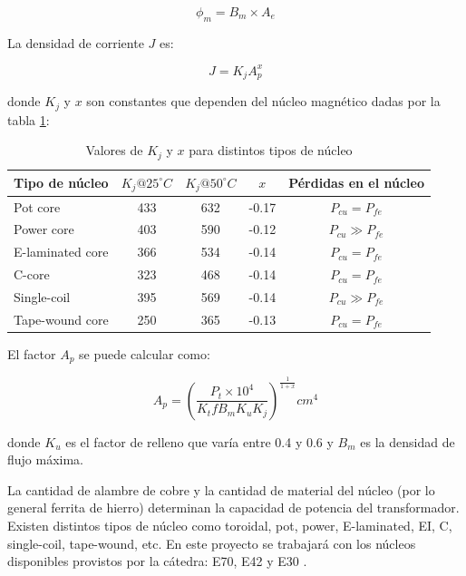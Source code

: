 $$ \phi_{m}=B_{m} \times A_{e} $$

La densidad de corriente $J$ es:

$$ J=K_jA_p^x $$

donde $K_j$ y $x$ son constantes que dependen del núcleo magnético dadas por la tabla \ref{tabla:Kj}:

\begin{table}[]
    \begin{tabular}{lcccc}
        \hline
        Tipo de núcleo   & $K_j @ 25^{\circ} C$ & $K_j @ 50^{\circ} C$ & $x$   & Pérdidas en el núcleo \\ \hline
        Pot core         & 433                  & 632                  & -0.17 & $P_{cu}=P_{fe}$       \\
        Power core       & 403                  & 590                  & -0.12 & $P_{cu}\gg P_{fe}$    \\
        E-laminated core & 366                  & 534                  & -0.14 & $P_{cu}=P_{fe}$       \\
        C-core           & 323                  & 468                  & -0.14 & $P_{cu}=P_{fe}$       \\
        Single-coil      & 395                  & 569                  & -0.14 & $P_{cu}\gg P_{fe}$    \\
        Tape-wound core  & 250                  & 365                  & -0.13 & $P_{cu}=P_{fe}$       \\ \hline
    \end{tabular}
    \caption{Valores de $K_j$ y $x$ para distintos tipos de núcleo}
    \label{tabla:Kj}
\end{table}

El factor $A_{p}$ se puede calcular como: 

$$ A_{p}=\left(\frac{P_{t} \times 10^{4}}{K_{t} f B_{m} K_{u} K_{j}}\right)^{\frac{1}{1+x}} {cm}^{4} $$

donde $K_u$ es el factor de relleno que varía entre 0.4 y 0.6 y $B_m$ es la densidad de flujo máxima.

La cantidad de alambre de cobre y la cantidad de material del núcleo (por lo general ferrita de hierro) determinan la capacidad de potencia del transformador. 
Existen distintos tipos de núcleo como toroidal, pot, power, E-laminated, EI, C, single-coil, tape-wound, etc. 
En este proyecto se trabajará con los núcleos disponibles provistos por la cátedra: E70, E42 y E30 \cite{trafos}. 

